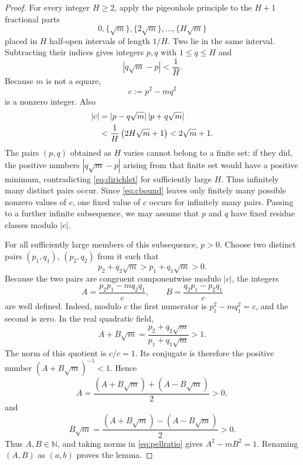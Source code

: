 \documentclass[11pt,a4paper]{amsart}
\numberwithin{equation}{section}
\theoremstyle{definition}
\newcommand{\N}{\mathbb N}
\begin{document}
\begin{proof}
For every integer \(H\ge2\), apply the pigeonhole principle to the
\(H+1\) fractional parts
\begin{equation*}
 0,\{\sqrt m\},\{2\sqrt m\},\ldots,\{H\sqrt m\}
\end{equation*}
placed in \(H\) half-open intervals of length \(1/H\).  Two lie in the
same interval.  Subtracting their indices gives integers \(p,q\) with
\(1\le q\le H\) and
\begin{equation}
 |q\sqrt m-p|<\frac1H.
 \label{eq:dirichlet}
\end{equation}
Because \(m\) is not a square,
\begin{equation}
 c:=p^2-mq^2
 \label{eq:cdef}
\end{equation}
is a nonzero integer.  Also
\begin{align}
 |c|
 &=|p-q\sqrt m|\,|p+q\sqrt m|\notag\\
 &<\frac1H\left(2H\sqrt m+1\right)
 <2\sqrt m+1.
 \label{eq:cbound}
\end{align}
The pairs \((p,q)\) obtained as \(H\) varies cannot belong to a finite
set: if they did, the positive numbers \(|q\sqrt m-p|\) arising from
that finite set would have a positive minimum, contradicting
\eqref{eq:dirichlet} for sufficiently large \(H\).  Thus infinitely
many distinct pairs occur.  Since \eqref{eq:cbound} leaves only
finitely many possible nonzero values of \(c\), one fixed value of
\(c\) occurs for infinitely many pairs.  Passing to a further infinite
subsequence, we may assume that \(p\) and \(q\) have fixed residue
classes modulo \(|c|\).

For all sufficiently large members of this subsequence, \(p>0\).
Choose two distinct pairs \((p_1,q_1)\), \((p_2,q_2)\) from it such
that
\begin{equation*}
 p_2+q_2\sqrt m>p_1+q_1\sqrt m>0.
\end{equation*}
Because the two pairs are congruent componentwise modulo \(|c|\), the
integers
\begin{equation}
 A=\frac{p_2p_1-mq_2q_1}{c},
 \qquad
 B=\frac{q_2p_1-p_2q_1}{c}
 \label{eq:ABpell}
\end{equation}
are well defined.  Indeed, modulo \(c\) the first numerator is
\(p_1^2-mq_1^2=c\), and the second is zero.  In the real quadratic
field,
\begin{equation}
 A+B\sqrt m
 =\frac{p_2+q_2\sqrt m}{p_1+q_1\sqrt m}>1.
 \label{eq:pellratio}
\end{equation}
The norm of this quotient is \(c/c=1\).  Its conjugate is therefore
the positive number \((A+B\sqrt m)^{-1}<1\).  Hence
\begin{equation*}
 A=\frac{(A+B\sqrt m)+(A-B\sqrt m)}2>0,
\end{equation*}
and
\begin{equation*}
 B\sqrt m
 =\frac{(A+B\sqrt m)-(A-B\sqrt m)}2>0.
\end{equation*}
Thus \(A,B\in\N\), and taking norms in \eqref{eq:pellratio} gives
\(A^2-mB^2=1\).  Renaming \((A,B)\) as \((a,b)\) proves the lemma.
\end{proof}
\end{document}
